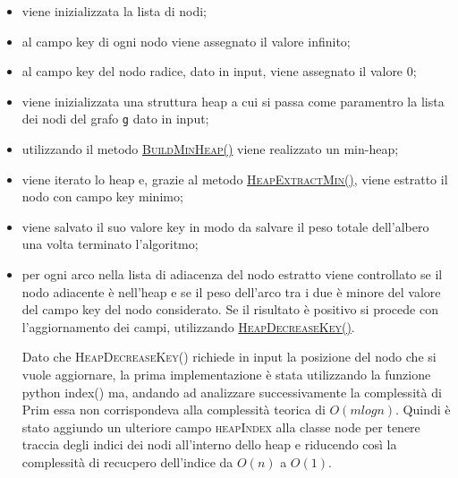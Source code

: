 \begin{itemize}
    \item viene inizializzata la lista di nodi;
    \item al campo key di ogni nodo viene assegnato il valore infinito;
    \item al campo key del nodo radice, dato in input, viene assegnato il valore 0;
    \item viene inizializzata una struttura heap a cui si passa come paramentro la lista dei nodi del grafo \texttt{g} dato in input;
    \item utilizzando il metodo \hyperlink{buildminheap}{\textsc{BuildMinHeap()}} viene realizzato un min-heap;
    \item viene iterato lo heap e, grazie al metodo \hyperlink{heapextractmin}{\textsc{HeapExtractMin()}}, viene estratto il nodo con campo key minimo;
    \item viene salvato il suo valore key in modo da salvare il peso totale dell'albero una volta terminato l'algoritmo;
    \item per ogni arco nella lista di adiacenza del nodo estratto viene controllato se il nodo adiacente è nell'heap e se il peso dell'arco tra i due è minore del valore del campo key del nodo considerato. Se il risultato è positivo si procede con l'aggiornamento dei campi, utilizzando \hyperlink{heapdecreasekey}{\textsc{HeapDecreaseKey()}}.

Dato che \textsc{HeapDecreaseKey()} richiede in input la posizione del nodo che si vuole aggiornare, la prima implementazione è stata utilizzando la funzione python index() ma, andando ad analizzare successivamente la complessità di Prim essa non corrispondeva alla complessità teorica di $O(m log{} n)$. Quindi è stato aggiundo un ulteriore campo \textsc{heapIndex} alla classe node per tenere traccia degli indici dei nodi all'interno dello heap e riducendo così la complessità di recucpero dell'indice da $O(n)$ a $O(1)$.

\end{itemize}
